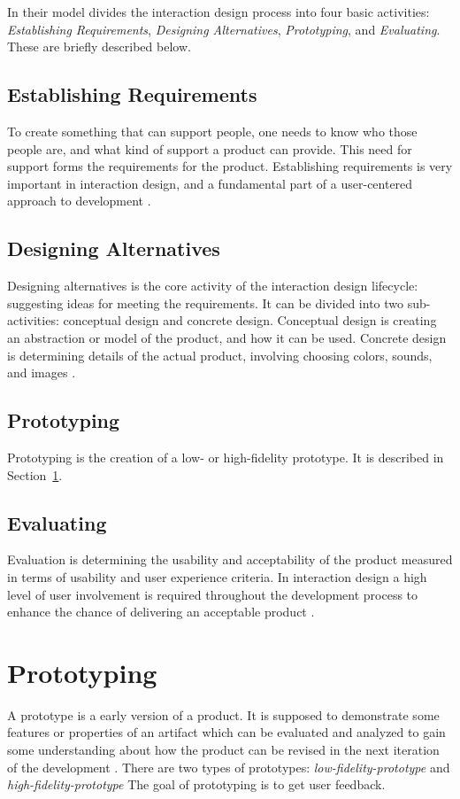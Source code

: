 \documentclass[../Main/thesis.tex]{subfiles}
\begin{document}
In their model \citet{Preece2011} divides the interaction design process into four basic activities: \textit{Establishing Requirements}, \textit{Designing Alternatives}, \textit{Prototyping}, and \textit{Evaluating}.
These are briefly described below.

\subsection{Establishing Requirements}
To create something that can support people, one needs to know who those people are, and what kind of support a product can provide. 
This need for support forms the requirements for the product.
Establishing requirements is very important in interaction design, and a fundamental part of a user-centered approach to development \citep{Preece2011}.

\subsection{Designing Alternatives}
Designing alternatives is the core activity of the interaction design lifecycle: suggesting ideas for meeting the requirements.
It can be divided into two sub-activities: conceptual design and concrete design.
Conceptual design is creating an abstraction or model of the product, and how it can be used.
Concrete design is determining details of the actual product, involving choosing colors, sounds, and images \citep{Preece2011}.

\subsection{Prototyping}
Prototyping is the creation of a low- or high-fidelity prototype.
It is described in Section~\ref{sec:prototyping}.

\subsection{Evaluating}
Evaluation is determining the usability and acceptability of the product measured in terms of usability and user experience criteria.
In interaction design a high level of user involvement is required throughout the development process to enhance the chance of delivering an acceptable product \citep{Preece2011}.

\section{Prototyping}
\label{sec:prototyping}
A prototype is a early version of a product. 
It is supposed to demonstrate some features or properties of an artifact which can be evaluated and analyzed to gain some understanding about how the product can be revised in the next iteration of the development \citep{oates2005researching}.
There are two types of prototypes: \textit{low-fidelity-prototype} and \textit{high-fidelity-prototype}
The goal of prototyping is to get user feedback.
\end{document}
